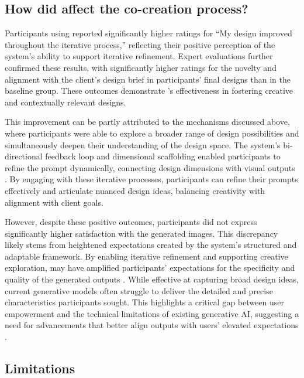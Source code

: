 \subsection{How did \toolname{} affect the co-creation process?}
Participants using \toolname{} reported significantly higher ratings for “My design improved throughout the iterative process,” reflecting their positive perception of the system’s ability to support iterative refinement. Expert evaluations further confirmed these results, with significantly higher ratings for the novelty and alignment with the client’s design brief in participants’ final designs than in the baseline group. These outcomes demonstrate \toolname{}’s effectiveness in fostering creative and contextually relevant designs.

This improvement can be partly attributed to the mechanisms discussed above, where participants were able to explore a broader range of design possibilities and simultaneously deepen their understanding of the design space. The system’s bi-directional feedback loop and dimensional scaffolding enabled participants to refine the prompt dynamically, connecting design dimensions with visual outputs \cite{green1989cognitive, davis2018scaffolding}. By engaging with these iterative processes, participants can refine their prompts effectively and articulate nuanced design ideas, balancing creativity with alignment with client goals.

However, despite these positive outcomes, participants did not express significantly higher satisfaction with the generated images. This discrepancy likely stems from heightened expectations created by the system’s structured and adaptable framework. By enabling iterative refinement and supporting creative exploration, \toolname{} may have amplified participants’ expectations for the specificity and quality of the generated outputs \cite{amershi2014power, zhou2024understanding}. While effective at capturing broad design ideas, current generative models often struggle to deliver the detailed and precise characteristics participants sought. This highlights a critical gap between user empowerment and the technical limitations of existing generative AI, suggesting a need for advancements that better align outputs with users’ elevated expectations \cite{lee2024holistic}. 

\subsection{Limitations}

